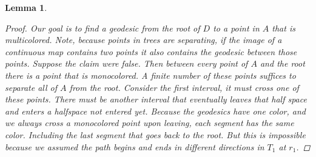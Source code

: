 \documentclass{article}
\theoremstyle{mystyle}
\newtheorem{lem}{Lemma}[section]
\theoremstyle{remark}
\begin{document}
\begin{lem}
\begin{proof}
        Our goal is to find a geodesic from the root of \(D\) to a point in \(A\) that is multicolored. Note, because points in trees are separating, if the image of a continuous map contains two points it also contains the geodesic between those points. Suppose the claim were false. Then between every point of \(A\) and the root there is a point that is monocolored. A finite number of these points suffices to separate all of \(A\) from the root. Consider the first interval, it must cross one of these points. There must be another interval that eventually leaves that half space and enters a halfspace not entered yet. Because the geodesics have one color, and we always cross a monocolored point upon leaving, each segment has the same color. Including the last segment that goes back to the root. But this is impossible because we assumed the path begins and ends in different directions in \(T_{1}\) at \(r_{1}\).

    \end{proof}
\end{lem}
\end{document}

